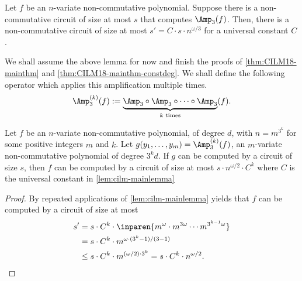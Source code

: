 \begin{lemma}\label{lem:cilm-mainlemma}
Let $f$ be an $n$-variate non-commutative polynomial. Suppose there is a non-commutative circuit of size at most $s$ that computes $\Amp_3(f)$. Then, there is a non-commutative circuit of size at most $s' = C \cdot s \cdot n^{\omega/3}$ for a universal constant $C$. 
\end{lemma}
We shall assume the above lemma for now and finish the proofs of \autoref{thm:CILM18-mainthm} and \autoref{thm:CILM18-mainthm-constdeg}. We shall define the following operator which applies this amplification multiple times. 
\[
  \Amp_3^{(k)}(f) := \underbrace{\Amp_3 \circ \Amp_3 \circ \cdots \circ \Amp_3}_{\text{$k$ times}} (f).\]
\begin{corollary}\label{cor:cilm-maincorr}
  Let $f$ be an $n$-variate non-commutative polynomial, of degree $d$, with $n = m^{3^k}$ for some positive integers $m$ and $k$. Let $g(y_1,\ldots, y_m) = \Amp_3^{(k)}(f)$, an $m$-variate non-commutative polynomial of degree $3^k d$. If $g$ can be computed by a circuit of size $s$, then $f$ can be computed by a circuit of size at most $s \cdot n^{\omega/2}\cdot C^k$ where $C$ is the universal constant in \autoref{lem:cilm-mainlemma}
\end{corollary}
\begin{proof}\belowdisplayskip=-12pt
  By repeated applications of \autoref{lem:cilm-mainlemma} yields that $f$ can be computed by a circuit of size at most
  \begin{align*}
    s' & = s \cdot C^k \cdot \inparen{m^{\omega} \cdot  m^{3\omega}\cdots m^{3^{k-1}\omega}}\\
       & = s \cdot C^k \cdot m^{\omega  \cdot (3^{k} - 1)/(3 - 1)}\\
       & \leq  s \cdot C^k \cdot m^{(\omega/2) \cdot 3^k} = s \cdot C^k \cdot n^{\omega/2}.
  \end{align*}
\end{proof}

